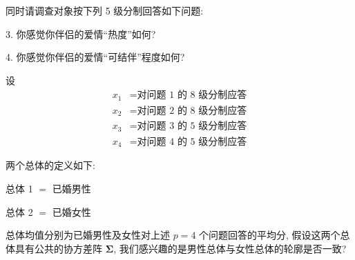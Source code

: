 同时请调查对象按下列 5 级分制回答如下问题:

3. 你感觉你伴侣的爱情“热度”如何?

4. 你感觉你伴侣的爱情“可结伴”程度如何?

\begin{mvfigure}
\end{mvfigure}

设
\[
\begin{aligned}
x_1&=\text{对问题 1 的 8 级分制应答}\\
x_2&=\text{对问题 2 的 8 级分制应答}\\
x_3&=\text{对问题 3 的 5 级分制应答}\\
x_4&=\text{对问题 4 的 5 级分制应答}
\end{aligned}
\]

两个总体的定义如下:

\noindent 总体 1 $=$ 已婚男性

\noindent 总体 2 $=$ 已婚女性

总体均值分别为已婚男性及女性对上述 $p=4$ 个问题回答的平均分, 假设这两个总体具有公共的协方差阵 $\boldsymbol{\Sigma}$, 我们感兴趣的是男性总体与女性总体的轮廓是否一致?
